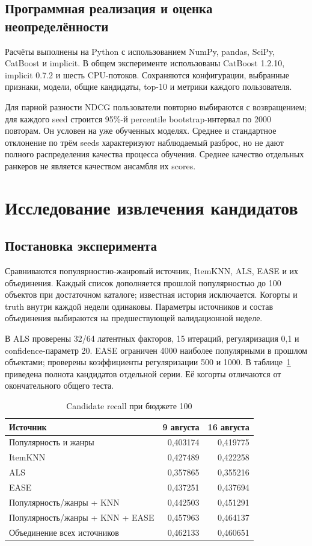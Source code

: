 \documentclass[12pt,a4paper]{article}
\begin{document}
\subsection{Программная реализация и оценка неопределённости}
Расчёты выполнены на Python с использованием NumPy, pandas, SciPy,
CatBoost и implicit. В общем эксперименте использованы CatBoost 1.2.10,
implicit 0.7.2 и шесть CPU-потоков. Сохраняются конфигурации, выбранные
признаки, модели, общие кандидаты, top-10 и метрики каждого пользователя.

Для парной разности NDCG пользователи повторно выбираются с возвращением;
для каждого seed строится 95\%-й percentile bootstrap-интервал по 2000
повторам. Он условен на уже обученных моделях. Среднее и стандартное
отклонение по трём seeds характеризуют наблюдаемый разброс, но не дают
полного распределения качества процесса обучения. Среднее качество
отдельных ранкеров не является качеством ансамбля их scores.

\section{Исследование извлечения кандидатов}
\subsection{Постановка эксперимента}
Сравниваются популярностно-жанровый источник, ItemKNN, ALS, EASE и
их объединения. Каждый список дополняется прошлой популярностью до
100 объектов при достаточном каталоге; известная история исключается.
Когорты и truth внутри каждой недели одинаковы. Параметры источников
и состав объединения выбираются на предшествующей валидационной неделе.

В ALS проверены 32/64 латентных факторов, 15 итераций, регуляризация 0,1
и confidence-параметр 20. EASE ограничен 4000 наиболее популярными
в прошлом объектами; проверены коэффициенты регуляризации 500 и 1000.
В таблице~\ref{tab:retrieval} приведена полнота кандидатов отдельной серии.
Её когорты отличаются от окончательного общего теста.
\begin{table}[H]
\centering
\small
\caption{Candidate recall при бюджете 100}\label{tab:retrieval}
\begin{tabular}{lrr}\toprule
Источник & 9 августа & 16 августа \\ \midrule
Популярность и жанры & 0,403174 & 0,419775 \\
ItemKNN & 0,427489 & 0,422258 \\
ALS & 0,357865 & 0,355216 \\
EASE & 0,437251 & 0,437694 \\
Популярность/жанры + KNN & 0,442503 & 0,451291 \\
Популярность/жанры + KNN + EASE & 0,457963 & 0,464137 \\
Объединение всех источников & 0,462133 & 0,460651 \\
\bottomrule
\end{tabular}
\end{table}
\end{document}
